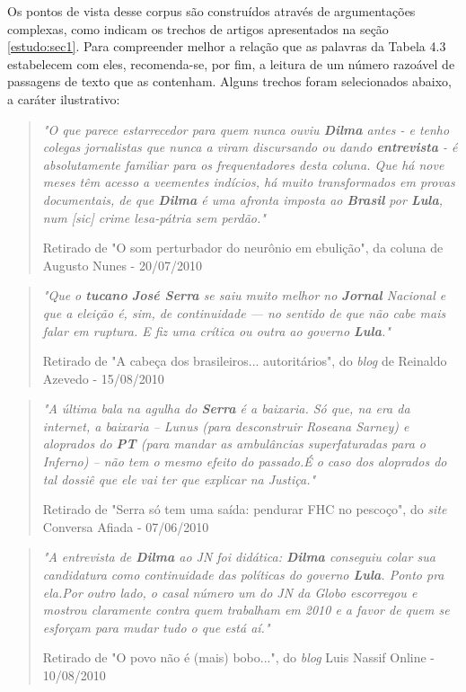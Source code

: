 Os pontos de vista desse corpus são construídos através de argumentações complexas, como indicam os trechos de artigos apresentados na seção \ref{estudo:sec1}. Para compreender melhor a relação que as palavras da Tabela 4.3 estabelecem com eles, recomenda-se, por fim, a leitura de um número razoável de passagens de texto que as contenham. Alguns trechos foram selecionados abaixo, a caráter ilustrativo:

\begin{quote}
\emph{"O que parece estarrecedor para quem nunca ouviu \textbf{Dilma} antes - e tenho colegas jornalistas que nunca a viram discursando ou dando \textbf{entrevista} - é absolutamente familiar para os frequentadores desta coluna. Que há nove meses têm acesso a veementes indícios, há muito transformados em provas documentais, de que \textbf{Dilma} é uma afronta imposta ao \textbf{Brasil} por \textbf{Lula}, num [sic] crime lesa-pátria sem perdão."}

{\small Retirado de "O som perturbador do neurônio em ebulição", da coluna de Augusto Nunes - 20/07/2010}
\end{quote}

\begin{quote}
\emph{"Que o \textbf{tucano} \textbf{José Serra} se saiu muito melhor no \textbf{Jornal} Nacional e que a eleição é, sim, de continuidade — no sentido de que não cabe mais falar em ruptura. E fiz uma crítica ou outra ao governo \textbf{Lula}."}

{\small Retirado de "A cabeça dos brasileiros... autoritários", do \emph{blog} de Reinaldo Azevedo - 15/08/2010}
\end{quote}

\begin{quote}

\emph{"A última bala na agulha do \textbf{Serra} é a baixaria. Só que, na era da internet, a baixaria – Lunus (para desconstruir Roseana Sarney) e aloprados do \textbf{PT} (para mandar as ambulâncias superfaturadas para o Inferno) – não tem o mesmo efeito do passado.É o caso dos aloprados do tal dossiê que ele vai ter que explicar na Justiça."}

{\small Retirado de "Serra só tem uma saída: pendurar FHC no pescoço", do \emph{site} Conversa Afiada - 07/06/2010}
\end{quote}

\begin{quote}
\emph{"A entrevista de \textbf{Dilma} ao JN foi didática: \textbf{Dilma} conseguiu colar sua candidatura como continuidade das políticas do governo \textbf{Lula}. Ponto pra ela.Por outro lado, o casal número um do JN da Globo escorregou e mostrou claramente contra quem trabalham em 2010 e a favor de quem se esforçam para mudar tudo o que está aí."}

{\small Retirado de "O povo não é (mais) bobo...", do \emph{blog} Luis Nassif Online - 10/08/2010}
\end{quote}


